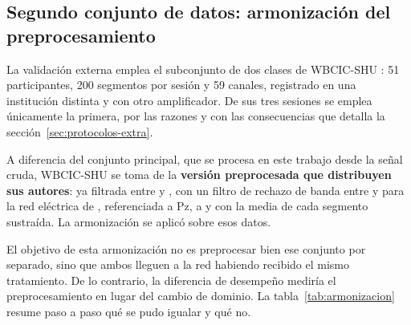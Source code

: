 \subsection{Segundo conjunto de datos: armonización del preprocesamiento}
\label{sec:wbcic-preproc}

La validación externa emplea el subconjunto de dos clases de WBCIC-SHU
\cite{yang2025wbcic}: 51 participantes, 200 segmentos por sesión y 59 canales,
registrado en una institución distinta y con otro amplificador. De sus tres
sesiones se emplea únicamente la primera, por las razones y con las consecuencias
que detalla la sección~\ref{sec:protocolos-extra}.

A diferencia del conjunto principal, que se procesa en este trabajo desde la señal cruda,
WBCIC-SHU se toma de la \textbf{versión preprocesada que distribuyen sus autores}: ya
filtrada entre  y , con un filtro de rechazo de banda entre  y 
para la red eléctrica de , referenciada a Pz, a  y con la media de cada
segmento sustraída. La armonización se aplicó sobre esos datos.

El objetivo de esta armonización no es preprocesar bien ese conjunto por separado,
sino que ambos lleguen a la red habiendo recibido el mismo tratamiento. De lo
contrario, la diferencia de desempeño mediría el preprocesamiento en lugar del
cambio de dominio. La tabla~\ref{tab:armonizacion} resume paso a paso qué se pudo
igualar y qué no.


